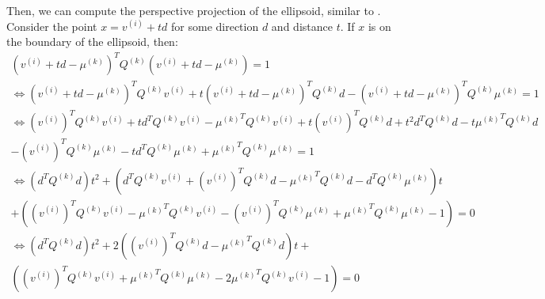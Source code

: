 \documentclass{article}
\theoremstyle{case}
\newcommand{\qk}{{Q^{(k)}}}
\newcommand{\centerk}{{\mu^{(k)}}}
\begin{document}
Then, we can compute the perspective projection of the ellipsoid, similar to \cite{eberly_2013}.
Consider the point $x = v^{(i)} + td$ for some direction $d$ and distance $t$.
If $x$ is on the boundary of the ellipsoid, then:
\begin{align*}
(v^{(i)} + t d - \centerk )^T \qk  (v^{(i)} + t d - \centerk ) = 1 \\
\Longleftrightarrow (v^{(i)} + t d - \centerk )^T \qk  v^{(i)} + t (v^{(i)} + t d - \centerk )^T \qk  d - (v^{(i)} + t d - \centerk )^T \qk  \centerk  = 1 \\
\Longleftrightarrow \left(v^{(i)}\right)^T \qk  v^{(i)} + t d^T \qk  v^{(i)} - \centerk ^T \qk  v^{(i)} + t \left(v^{(i)}\right)^T \qk  d + t^2 d^T \qk  d - t \centerk ^T \qk  d \\- \left(v^{(i)}\right)^T \qk  \centerk  - t d^T \qk  \centerk + \centerk ^T \qk  \centerk  = 1 \\
\Longleftrightarrow \left(d^T\qk d
\right) t^2 + \left(
d^T \qk  v^{(i)} +  \left(v^{(i)}\right)^T \qk  d - \centerk ^T \qk  d - d^T \qk  \centerk 
\right) t \\ +  \left(
\left(v^{(i)}\right)^T \qk  v^{(i)} - \centerk ^T \qk  v^{(i)} - \left(v^{(i)}\right)^T \qk  \centerk   + \centerk ^T \qk  \centerk  - 1
\right) = 0 \\
\Longleftrightarrow \left(d^T\qk d
\right) t^2 + 2\left(
\left(v^{(i)}\right)^T \qk  d - \centerk ^T\qk d
\right) t + \\ \left(
\left(v^{(i)}\right)^T \qk  v^{(i)} + \centerk ^T \qk  \centerk  - 2 \centerk ^T \qk  v^{(i)} - 1
\right) = 0
\end{align*}
\end{document}
